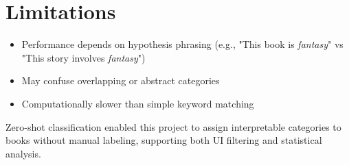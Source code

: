 \section*{Limitations}
\begin{itemize}
  \item Performance depends on hypothesis phrasing (e.g., "This book is \textit{fantasy}" vs "This story involves \textit{fantasy}")
  \item May confuse overlapping or abstract categories
  \item Computationally slower than simple keyword matching
\end{itemize}

Zero-shot classification enabled this project to assign interpretable categories to books without manual labeling, supporting both UI filtering and statistical analysis.

